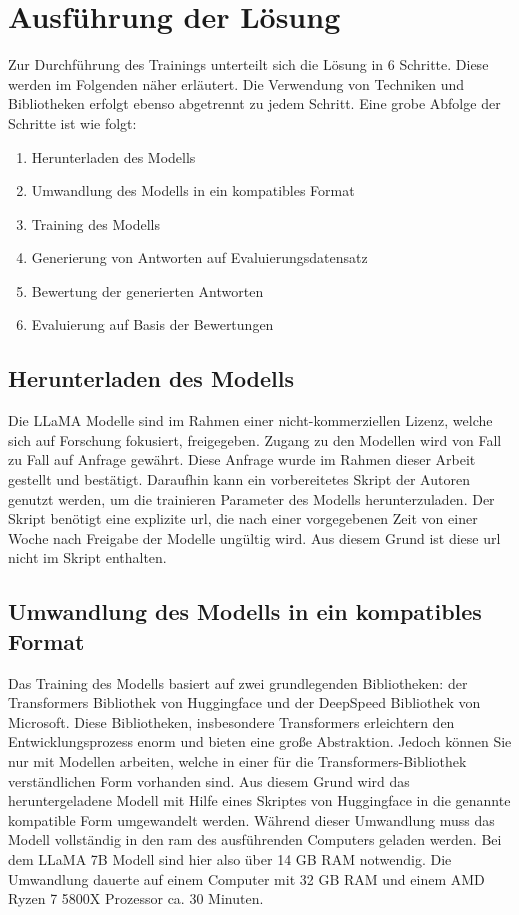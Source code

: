 \chapter{Ausführung der Lösung}\label{ch:solution}

Zur Durchführung des Trainings unterteilt sich die Lösung in 6 Schritte.
Diese werden im Folgenden näher erläutert. Die Verwendung von Techniken und Bibliotheken erfolgt ebenso abgetrennt zu jedem Schritt.
Eine grobe Abfolge der Schritte ist wie folgt:
\begin{enumerate}
    \item Herunterladen des Modells
    \item Umwandlung des Modells in ein kompatibles Format
    \item Training des Modells
    \item Generierung von Antworten auf Evaluierungsdatensatz
    \item Bewertung der generierten Antworten
    \item Evaluierung auf Basis der Bewertungen
\end{enumerate}

\section{Herunterladen des Modells}
Die LLaMA Modelle sind im Rahmen einer nicht-kommerziellen Lizenz, welche sich auf Forschung fokusiert, freigegeben. Zugang zu den Modellen wird von Fall zu Fall auf Anfrage gewährt. Diese Anfrage wurde im Rahmen dieser Arbeit gestellt und bestätigt.
Daraufhin kann ein vorbereitetes Skript der Autoren genutzt werden, um die trainieren Parameter des Modells herunterzuladen.
Der Skript benötigt eine explizite \ac{url}, die nach einer vorgegebenen Zeit von einer Woche nach Freigabe der Modelle ungültig wird. Aus diesem Grund ist diese \ac{url} nicht im Skript enthalten.

\section{Umwandlung des Modells in ein kompatibles Format}
Das Training des Modells basiert auf zwei grundlegenden Bibliotheken: der Transformers Bibliothek von Huggingface und der DeepSpeed Bibliothek von Microsoft.
Diese Bibliotheken, insbesondere Transformers erleichtern den Entwicklungsprozess enorm und bieten eine große Abstraktion. Jedoch können Sie nur mit Modellen arbeiten, welche in einer für die Transformers-Bibliothek verständlichen Form vorhanden sind.
Aus diesem Grund wird das heruntergeladene Modell mit Hilfe eines Skriptes von Huggingface in die genannte kompatible Form umgewandelt werden.
Während dieser Umwandlung muss das Modell vollständig in den \ac{ram} des ausführenden Computers geladen werden. Bei dem LLaMA 7B Modell sind hier also über 14 GB RAM notwendig.
Die Umwandlung dauerte auf einem Computer mit 32 GB RAM und einem AMD Ryzen 7 5800X Prozessor ca. 30 Minuten.

